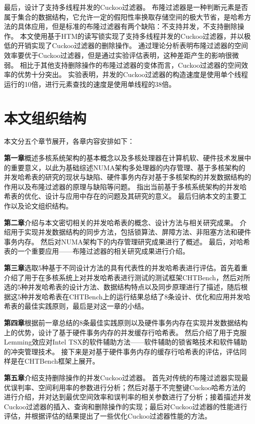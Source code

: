 最后，设计了支持多线程并发的Cuckoo过滤器。
布隆过滤器是一种判断元素是否属于集合的数据结构，它允许一定的假阳性率换取存储空间的极大节省，是哈希方法的具体应用，但是标准的布隆过滤器有两个缺陷：不支持并发，不支持删除操作。
本文使用基于HTM的读写锁实现了支持多线程并发的Cuckoo过滤器，并以极低的开销实现了Cuckoo过滤器的删除操作。
通过理论分析表明布隆过滤器的空间效率要优于Cuckoo过滤器，但是通过实验评估表明，这种差距产生的影响很微弱。
相比于其他支持删除操作的布隆过滤器的变体而言，Cuckoo过滤器的空间效率的优势十分突出。
实验表明，并发的Cuckoo过滤器的构造速度是使用单个线程运行的10倍，进行元素查找的速度是使用单线程的38倍。


\section{本文组织结构}
本文分五个章节展开，各章内容安排如下：

\textbf{第一章}概述多核系统架构的基本概念以及多核处理器在计算机软、硬件技术发展中的重要意义，以此为基础综述NUMA架构多处理器的内存管理、基于多核架构的并发哈希表的研究的现状与缺陷、硬件事务内存对基于多核架构的并发数据结构的作用以及布隆过滤器的原理与缺陷等问题。
指出当前基于多核系统架构的并发哈希表的优化、设计与应用中存在的问题及其研究的意义。
最后归纳本文的主要工作以及论文组织结构。

\textbf{第二章}介绍与本文密切相关的并发哈希表的概念、设计方法与相关研究成果。
介绍用于实现并发数据结构的同步方法，包括锁算法、屏障方法、非阻塞方法和硬件事务内存。
然后对NUMA架构下的内存管理研究成果进行了概述。
最后，对哈希表的一个重要应用——布隆过滤器的相关研究成果进行介绍。

\textbf{第三章}选取5种基于不同设计方法的具有代表性的并发哈希表进行评估。首先着重介绍了用于在多核系统上对并发哈希表进行测试的测试框架CHTBench，然后对所选的5种并发哈希表的设计方法、数据结构特点以及同步原理进行了描述，随后根据这5种并发哈希表在CHTBench上的运行结果总结了8条设计、优化和应用并发哈希表的最佳实践原则，最后是对这一章的小结。

\textbf{第四章}根据前一章总结的8条最佳实践原则以及硬件事务内存在实现并发数据结构上的优势，设计了基于硬件事务内存的并发缓存行哈希表。
然后介绍了用于克服Lemming效应对Intel TSX的软件辅助方法——软件辅助的锁省略技术和软件辅助的冲突管理技术。
接下来是对基于硬件事务内存的缓存行哈希表的评估，评估同样是在CHTBench框架上展开。

\textbf{第五章}介绍支持删除操作的并发Cuckoo过滤器。
首先对传统的布隆过滤器实现最优误判率、空间利用率的参数进行分析；然后对基于不完整键Cuckoo哈希方法的进行介绍，并对达到最优空间效率和误判率的相关参数进行了分析；接着描述并发Cuckoo过滤器的插入、查询和删除操作的实现；最后对Cuckoo过滤器的性能进行评估，并根据评估的结果提出了一些优化Cuckoo过滤器性能的方法。

